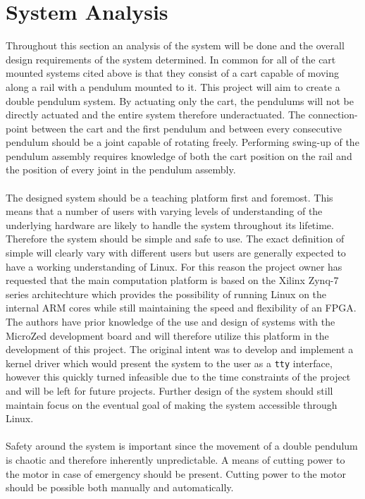 \section{System Analysis}
Throughout this section an analysis of the system will be done and the overall design requirements of the system determined.
In common for all of the cart mounted systems cited above is that they consist of a cart capable of moving along a rail with a pendulum mounted to it.
This project will aim to create a double pendulum system.
By actuating only the cart, the pendulums will not be directly actuated and the entire system therefore underactuated.
The connection-point between the cart and the first pendulum and between every consecutive pendulum should be a joint capable of rotating freely.
Performing swing-up of the pendulum assembly requires knowledge of both the cart position on the rail and the position of every joint in the pendulum assembly.  
\\~\\
The designed system should be a teaching platform first and foremost.
This means that a number of users with varying levels of understanding of the underlying hardware are likely to handle the system throughout its lifetime.
Therefore the system should be simple and safe to use.
The exact definition of simple will clearly vary with different users but users are generally expected to have a working understanding of Linux.
For this reason the project owner has requested that the main computation platform is based on the Xilinx Zynq-7 series architechture which provides the possibility of running Linux on the internal ARM cores while still maintaining the speed and flexibility of an FPGA.
The authors have prior knowledge of the use and design of systems with the MicroZed development board and will therefore utilize this platform in the development of this project. 
The original intent was to develop and implement a kernel driver which would present the system to the user as a \texttt{tty} interface, however this quickly turned infeasible due to the time constraints of the project and will be left for future projects.
Further design of the system should still maintain focus on the eventual goal of making the system accessible through Linux.
\\~\\
Safety around the system is important since the movement of a double pendulum is chaotic and therefore inherently unpredictable.
A means of cutting power to the motor in case of emergency should be present.  
Cutting power to the motor should be possible both manually and automatically.
